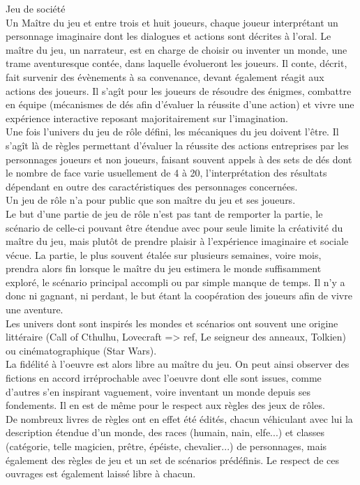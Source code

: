 \documentclass[a4paper,12pt,final,oneside]{article}
\begin{document}
Jeu de société\\
Un Maître du jeu et entre trois et huit joueurs, chaque joueur interprétant un personnage imaginaire dont les dialogues et actions sont décrites à l'oral. Le maître du jeu, un narrateur, est en charge de choisir ou inventer un monde, une trame aventuresque contée, dans laquelle évolueront les joueurs. Il conte, décrit, fait survenir des évènements à sa convenance, devant également réagit aux actions des joueurs. Il s'agît pour les joueurs de résoudre des énigmes, combattre en équipe (mécanismes de dés afin d'évaluer la réussite d'une action) et vivre une expérience interactive reposant majoritairement sur l'imagination.\\
Une fois l'univers du jeu de rôle défini, les mécaniques du jeu doivent l'être. Il s'agît là de règles permettant d'évaluer la réussite des actions entreprises par les personnages joueurs et non joueurs, faisant souvent appels à des sets de dés dont le nombre de face varie usuellement de 4 à 20, l'interprétation des résultats dépendant en outre des caractéristiques des personnages concernées.\\
Un jeu de rôle n'a pour public que son maître du jeu et ses joueurs.\\
Le but d'une partie de jeu de rôle n'est pas tant de remporter la partie, le scénario de celle-ci pouvant être étendue avec pour seule limite la créativité du maître du jeu, mais plutôt de prendre plaisir à l'expérience imaginaire et sociale vécue. La partie, le plus souvent étalée sur plusieurs semaines, voire mois, prendra alors fin lorsque le maître du jeu estimera le monde suffisamment exploré, le scénario principal accompli ou par simple manque de temps. Il n'y a donc ni gagnant, ni perdant, le but étant la coopération des joueurs afin de vivre une aventure.\\

Les univers dont sont inspirés les mondes et scénarios ont souvent une origine littéraire (Call of Cthulhu, Lovecraft => ref, Le seigneur des anneaux, Tolkien) ou cinématographique (Star Wars).\\
La fidélité à l'oeuvre est alors libre au maître du jeu. On peut ainsi observer des fictions en accord irréprochable avec l'oeuvre dont elle sont issues, comme d'autres s'en inspirant vaguement, voire inventant un monde depuis ses fondements. Il en est de même pour le respect aux règles des jeux de rôles.\\
De nombreux livres de règles ont en effet été édités, chacun véhiculant avec lui la description étendue d'un monde, des races (humain, nain, elfe...) et classes (catégorie, telle magicien, prêtre, épéiste, chevalier...) de personnages, mais également des règles de jeu et un set de scénarios prédéfinis. Le respect de ces ouvrages est également laissé libre à chacun.\\
\end{document}
